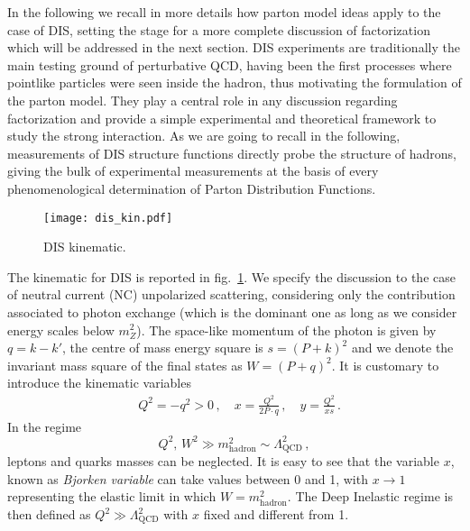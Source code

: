 %
In the following we recall in more details how parton model ideas apply to the case of 
DIS, setting the stage for a more complete 
discussion of factorization which will be addressed in the next section. %
DIS experiments are traditionally the main testing ground of perturbative QCD,
having been the first processes where pointlike particles were seen inside the hadron, 
thus motivating the formulation of the parton model. 
They play a central role in any discussion regarding factorization and provide a simple experimental and theoretical framework to
study the strong interaction.
As we are going to recall in the following, measurements of DIS structure functions directly probe the structure of hadrons, 
giving the bulk of experimental measurements at the basis of every phenomenological determination of Parton Distribution Functions.

\begin{figure}[h!]
    \center
    \texttt{[image: dis\_kin.pdf]}
    \caption{DIS kinematic.}
    \label{fig:DIS_kin}
\end{figure}

The kinematic for DIS is reported in fig.~\ref{fig:DIS_kin}.
We specify the discussion to the case of neutral current (NC) unpolarized scattering, 
considering only the contribution associated to photon exchange (which is the dominant one as long as
we consider energy scales below $m_Z^2$).
The space-like momentum of the photon is given by $q = k - k'$, the centre of mass energy square is $s=\left(P+k\right)^2$ and
we denote the invariant mass square of the final states as $W = \left(P+q\right)^2$.
It is customary to introduce the kinematic variables
\begin{align}
	\label{eq:DIS_kinematic}
    & Q^2 = -q^2 > 0\,, \,\,\,\,\,\, x = \frac{Q^2}{2P\cdot q}\,, \,\,\,\,\,\, y = \frac{Q^2}{x s}\,.
\end{align}
In the regime 
$$ Q^2,\, W^2 \gg m^2_{\text{hadron}} \sim \Lambda^2_{\text{QCD}}\,, $$ 
leptons and quarks masses can be neglected.
It is easy to see that the variable $x$, known as \textit{Bjorken variable} can take values between 0 and 1, 
with $x\rightarrow 1$ representing the elastic limit in which $W=m^2_{\text{hadron}}$. The Deep Inelastic regime
is then defined as $Q^2 \gg \Lambda^2_{\text{QCD}} $ with $x$ fixed and different from 1.

